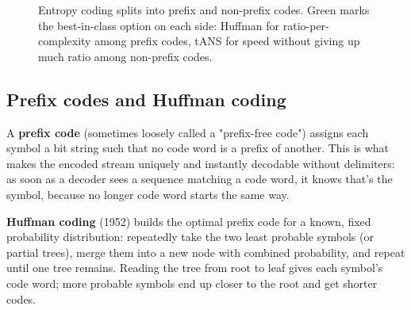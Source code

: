 \documentclass[11pt]{article}
\begin{document}
\begin{figure}[h]
\centering
{}
\caption{Entropy coding splits into prefix and non-prefix codes. Green marks the best-in-class option on each side: Huffman for ratio-per-complexity among prefix codes, tANS for speed without giving up much ratio among non-prefix codes.}
\end{figure}

\subsection{Prefix codes and Huffman coding}

A \textbf{prefix code} (sometimes loosely called a "prefix-free code") assigns each symbol a bit string such that no code word is a prefix of another. This is what makes the encoded stream uniquely and instantly decodable without delimiters: as soon as a decoder sees a sequence matching a code word, it knows that's the symbol, because no longer code word starts the same way.

\textbf{Huffman coding} (1952) builds the optimal prefix code for a known, fixed probability distribution: repeatedly take the two least probable symbols (or partial trees), merge them into a new node with combined probability, and repeat until one tree remains. Reading the tree from root to leaf gives each symbol's code word; more probable symbols end up closer to the root and get shorter codes.
\end{document}

